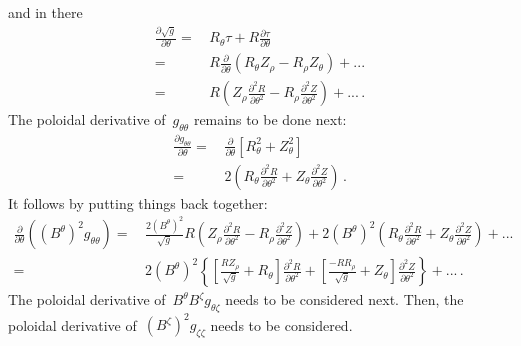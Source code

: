 and in there
\begin{align}
 \frac{\partial \sqrt{g}}{\partial \theta}
 =&\, R_\theta \tau + R \frac{\partial \tau}{\partial \theta} \nonumber \\
 =&\, R \frac{\partial}{\partial \theta} \left( R_\theta Z_\rho - R_\rho Z_\theta \right) + ... \nonumber \\
 =&\, R \left(   Z_\rho \frac{\partial^2 R}{\partial \theta^2}
               - R_\rho \frac{\partial^2 Z}{\partial \theta^2} \right) + ... \, .
\end{align}
%
The poloidal derivative of~$g_{\theta \theta}$
remains to be done next:
\begin{align}
 \frac{\partial g_{\theta \theta}}{\partial \theta}
 =&\, \frac{\partial}{\partial \theta}
        \left[ R_\theta^2 + Z_\theta^2 \right] \nonumber \\
 =&\, 2 \left(   R_\theta \frac{\partial^2 R}{\partial \theta^2}
               + Z_\theta \frac{\partial^2 Z}{\partial \theta^2} \right) \, .
\end{align}
It follows by putting things back together:
\begin{align}
 \frac{\partial}{\partial \theta} \left( (B^\theta)^2 g_{\theta \theta} \right)
 =&\, \frac{2 \left( B^\theta \right)^2}{\sqrt{g}}
        R \left(   Z_\rho \frac{\partial^2 R}{\partial \theta^2}
                 - R_\rho \frac{\partial^2 Z}{\partial \theta^2} \right)
      +
      2 (B^\theta)^2 \left(   R_\theta \frac{\partial^2 R}{\partial \theta^2}
                            + Z_\theta \frac{\partial^2 Z}{\partial \theta^2} \right) + ... \nonumber \\
 =&\, 2 \left( B^\theta \right)^2  \left\{
          \left[
            \frac{R Z_\rho}{\sqrt{g}} + R_\theta
          \right] \frac{\partial^2 R}{\partial \theta^2}
        + \left[
            \frac{- R R_\rho}{\sqrt{g}} + Z_\theta
          \right] \frac{\partial^2 Z}{\partial \theta^2}
      \right\} + ... \, .
\end{align}
%
The poloidal derivative of~$B^\theta B^\zeta g_{\theta \zeta}$
needs to be considered next.
Then, the poloidal derivative of~$\left(B^\zeta \right)^2 g_{\zeta \zeta}$
needs to be considered.

\FloatBarrier
